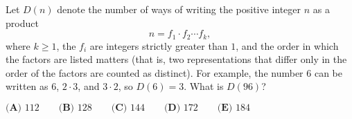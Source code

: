 Let $D(n)$ denote the number of ways of writing the positive integer $n$ as a product$$n = f_1\cdot f_2\cdots f_k,$$where $k\ge1$, the $f_i$ are integers strictly greater than $1$, and the order in which the factors are listed matters (that is, two representations that differ only in the order of the factors are counted as distinct). For example, the number $6$ can be written as $6$, $2\cdot 3$, and $3\cdot2$, so $D(6) = 3$. What is $D(96)$?

$\textbf{(A) } 112 \qquad\textbf{(B) } 128 \qquad\textbf{(C) } 144 \qquad\textbf{(D) } 172 \qquad\textbf{(E) } 184$